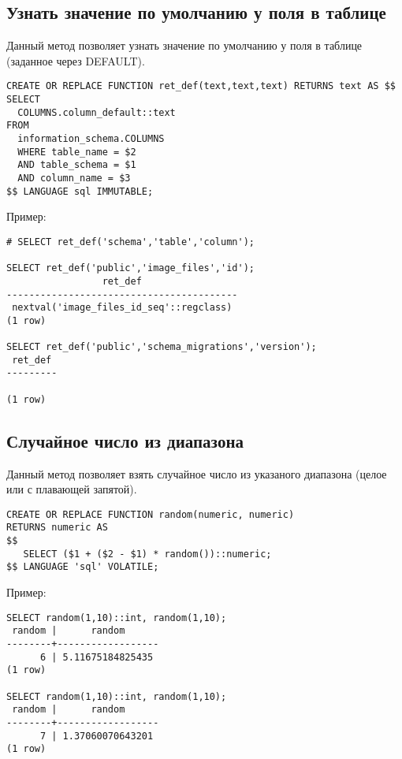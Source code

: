 \subsection{Узнать значение по умолчанию у поля в таблице}
Данный метод позволяет узнать значение по умолчанию у поля в таблице (заданное через DEFAULT).

\begin{lstlisting}[label=lst:snippets6,title=snippets/default\_value.sql]
CREATE OR REPLACE FUNCTION ret_def(text,text,text) RETURNS text AS $$
SELECT 
  COLUMNS.column_default::text
FROM 
  information_schema.COLUMNS
  WHERE table_name = $2
  AND table_schema = $1
  AND column_name = $3
$$ LANGUAGE sql IMMUTABLE;
\end{lstlisting}

Пример:
\begin{lstlisting}[label=lst:snippets7,caption=Узнать значение по умолчанию у поля в таблице. Пример]
# SELECT ret_def('schema','table','column');

SELECT ret_def('public','image_files','id');
                 ret_def                 
-----------------------------------------
 nextval('image_files_id_seq'::regclass)
(1 row)

SELECT ret_def('public','schema_migrations','version');
 ret_def 
---------
 
(1 row)
\end{lstlisting}

\subsection{Случайное число из диапазона}
Данный метод позволяет взять случайное число из указаного диапазона (целое или с плавающей запятой).

\begin{lstlisting}[label=lst:snippets8,title=snippets/random\_from\_range.sql]
CREATE OR REPLACE FUNCTION random(numeric, numeric)
RETURNS numeric AS
$$
   SELECT ($1 + ($2 - $1) * random())::numeric;
$$ LANGUAGE 'sql' VOLATILE;
\end{lstlisting}

Пример:
\begin{lstlisting}[label=lst:snippets9,caption=Случайное число из диапазона. Пример]
SELECT random(1,10)::int, random(1,10);
 random |      random      
--------+------------------
      6 | 5.11675184825435
(1 row)

SELECT random(1,10)::int, random(1,10);
 random |      random      
--------+------------------
      7 | 1.37060070643201
(1 row)
\end{lstlisting}

